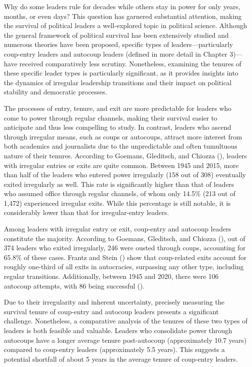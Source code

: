 \documentclass[
  12pt,
]{report}
\begin{document}
Why do some leaders rule for decades while others stay in power for only
years, months, or even days? This question has garnered substantial
attention, making the survival of political leaders a well-explored
topic in political science. Although the general framework of political
survival has been extensively studied and numerous theories have been
proposed, specific types of leaders---particularly coup-entry leaders
and autocoup leaders (defined in more detail in Chapter 3)---have
received comparatively less scrutiny. Nonetheless, examining the tenures
of these specific leader types is particularly significant, as it
provides insights into the dynamics of irregular leadership transitions
and their impact on political stability and democratic processes.

The processes of entry, tenure, and exit are more predictable for
leaders who come to power through regular channels, making their
survival easier to anticipate and thus less compelling to study. In
contrast, leaders who ascend through irregular means, such as coups or
autocoups, attract more interest from both academics and journalists due
to the unpredictable and often tumultuous nature of their tenures.
According to Goemans, Gleditsch, and Chiozza
(), leaders with irregular entries or
exits are quite common. Between 1945 and 2015, more than half of the
leaders who entered power irregularly (158 out of 308) eventually exited
irregularly as well. This rate is significantly higher than that of
leaders who assumed office through regular channels, of whom only 14.5\%
(213 out of 1,472) experienced irregular exits. While this percentage is
still notable, it is considerably lower than that for irregular-entry
leaders.

Among leaders with irregular entry or exit, coup-entry and autocoup
leaders constitute the majority. According to Goemans, Gleditsch, and
Chiozza (), out of 374 leaders who
exited irregularly, 246 were ousted through coups, accounting for 65.8\%
of these cases. Frantz and Stein () show
that coup-related exits account for roughly one-third of all exits in
autocracies, surpassing any other type, including regular transitions.
Additionally, between 1945 and 2020, there were 106 autocoup attempts,
with 86 being successful ().

Due to their irregularity and inherent uncertainty, precisely measuring
the survival tenure of coup-entry and autocoup leaders presents a
significant challenge. Nonetheless, a comparative analysis of the
tenures of these two types of leaders is both feasible and valuable.
Leaders who consolidate power through autocoups have a longer average
tenure post-autocoup (approximately 10.7 years) compared to coup-entry
leaders (approximately 5.5 years). This suggests a potential shortfall
of about 5 years in the average tenure of coup-entry leaders.
\end{document}

